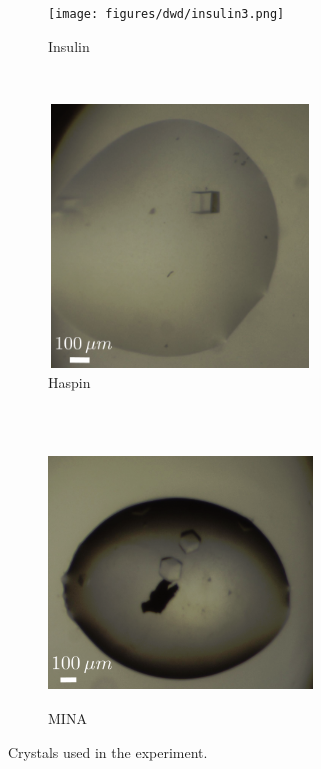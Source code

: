 \begin{figure}
        \centering
        \begin{subfigure}[b]{1\textwidth}
                \centering
                \texttt{[image: figures/dwd/insulin3.png]}
                \caption{Insulin}
                \label{fig: Cubic insulin crystals}
        \end{subfigure}
				\\
        \begin{subfigure}[b]{1\textwidth}
                \centering
                \includegraphics[width=7cm,height=7cm]{figures/dwd/haspin2.png}
                \caption{Haspin}
                \label{fig: Cubic haspin crytals}
        \end{subfigure}
				\\
        \begin{subfigure}[b]{1\textwidth}
                \centering
                \includegraphics[width=7cm,height=7cm]{figures/dwd/mina2.png}
                \caption{MINA}
                \label{fig: Cubic MINA crystals}
        \end{subfigure}
				\caption[Crystals used in the experiment at PETRA III, Hamburg]{Crystals used in the experiment.}
        \label{figcrystals}
\end{figure}

